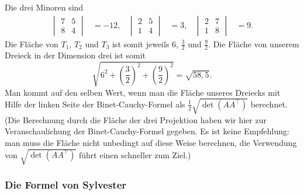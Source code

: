 \begin{bsp}
	Die drei Minoren sind 
	\begin{align*}
			\begin{vmatrix} 
				 7 & 5
				 \\ 8 & 4
			\end{vmatrix} 
			& = -12, 
			& 
			\begin{vmatrix} 
			2 & 5
		\\ 1 & 4
		\end{vmatrix} 
			&	 = 3, 
			&
			\begin{vmatrix} 
	2 & 7
	\\ 1 & 8
\end{vmatrix} 
&	 = 9.
	\end{align*}
	Die Fläche von $T_1$, $T_2$ und $T_3$ ist somit jeweils $6$, $\frac{3}{2}$ und $\frac{9}{2}$. Die Fläche von unserem Dreieck in der Dimension drei ist somit 
	\[
		\sqrt{ 6^2 + \left( \frac{3}{2} \right)^2 + \left( \frac{9}{2} \right)^{2}} = \sqrt{58{,}5}.
	\]
	Man kommt auf den selben Wert, wenn man die Fläche unseres Dreiecks mit Hilfe der linken Seite der Binet-Cauchy-Formel als $\frac{1}{2} \sqrt{\det(A A^\top)}$ berechnet. (Die Berechnung durch die Fläche der drei Projektion haben wir hier zur Veranschaulichung der Binet-Cauchy-Formel gegeben. Es ist keine Empfehlung: man muss die Fläche nicht unbedingt auf diese Weise berechnen, die Verwendung von $\sqrt{\det(A A^\top)}$ führt einen schneller zum Ziel.) 
\end{bsp}

\subsubsection{Die Formel von Sylvester} 

